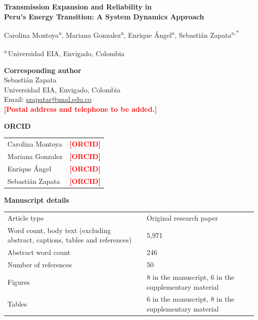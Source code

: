 \documentclass[11pt]{article}
\newcommand{\todo}[1]{\textcolor{red}{\textbf{[#1]}}}
\begin{document}
\begin{center}
  {\LARGE\bfseries Transmission Expansion and Reliability in\\[3pt]
   Peru's Energy Transition: A System Dynamics Approach\par}
\end{center}

\vspace{1.2em}

\begin{center}
  Carolina Montoya\textsuperscript{a},\;
  Mariana Gonzalez\textsuperscript{a},\;
  Enrique Ángel\textsuperscript{a},\;
  Sebastián Zapata\textsuperscript{a,*}
\end{center}

\vspace{0.4em}

\begin{center}
  \textsuperscript{a}\,Universidad EIA, Envigado, Colombia
\end{center}

\vspace{1.6em}

\noindent\textbf{Corresponding author}\\[2pt]
Sebastián Zapata\\
Universidad EIA, Envigado, Colombia\\
Email: \href{mailto:szapatar@unal.edu.co}{szapatar@unal.edu.co}\\
\todo{Postal address and telephone to be added.}

\vspace{1.2em}

\noindent\textbf{ORCID}\\[2pt]
\begin{tabular}{@{}ll@{}}
  Carolina Montoya  & \todo{ORCID} \\
  Mariana Gonzalez  & \todo{ORCID} \\
  Enrique Ángel     & \todo{ORCID} \\
  Sebastián Zapata  & \todo{ORCID} \\
\end{tabular}

\vspace{1.4em}

\noindent\textbf{Manuscript details}\\[2pt]
\begin{tabular}{@{}p{7.3cm}p{7.6cm}@{}}
  Article type         & Original research paper \\
  Word count, body text (excluding abstract, captions, tables and references)
                       & 5{,}971 \\
  Abstract word count  & 246 \\
  Number of references & 50 \\
  Figures              & 8 in the manuscript, 6 in the supplementary material \\
  Tables               & 6 in the manuscript, 8 in the supplementary material \\
\end{tabular}
\end{document}
